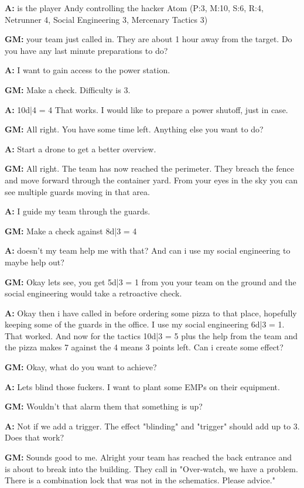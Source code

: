 \documentclass[11pt]{article}
\begin{document}
{\begin{multicols}{2}[]
\textbf{A:} is the player Andy controlling the hacker Atom (P:3, M:10, S:6, R:4, Netrunner 4, Social Engineering 3, Mercenary Tactics 3)

\textbf{GM:} your team just called in. They are about 1 hour away from the target. Do you have any last minute preparations to do?

\textbf{A:} I want to gain access to the power station.

\textbf{GM:} Make a check. Difficulty is 3.

\textbf{A:} 10d|4 = 4 That works. I would like to prepare a power shutoff, just in case.

\textbf{GM:} All right. You have some time left. Anything else you want to do?

\textbf{A:} Start a drone to get a better overview.

\textbf{GM:} All right. The team has now reached the perimeter. They breach the fence and move forward through the container yard. From your eyes in the sky you can see multiple guards moving in that area.

\textbf{A:} I guide my team through the guards.

\textbf{GM:} Make a check against 8d|3 = 4

\textbf{A:} doesn't my team help me with that? And can i use my social engineering to maybe help out?

\textbf{GM:} Okay lets see, you get 5d|3 = 1 from you your team on the ground and the social engineering would take a retroactive check.

\textbf{A:} Okay then i have called in before ordering some pizza to that place, hopefully keeping some of the guards in the office. I use my social engineering 6d|3 = 1. That worked. And now for the tactics 10d|3 = 5 plus the help from the team and the pizza makes 7 against the 4 means 3 points left. Can i create some effect?

\textbf{GM:} Okay, what do you want to achieve?

\textbf{A:} Lets blind those fuckers. I want to plant some EMPs on their equipment.

\textbf{GM:} Wouldn't that alarm them that something is up?

\textbf{A:} Not if we add a trigger. The effect "blinding" and "trigger" should add up to 3. Does that work?

\textbf{GM:} Sounds good to me. Alright your team has reached the back entrance and is about to break into the building. They call in "Over-watch, we have a problem. There is a combination lock that was not in the schematics. Please advice."


\end{multicols}}
\end{document}
